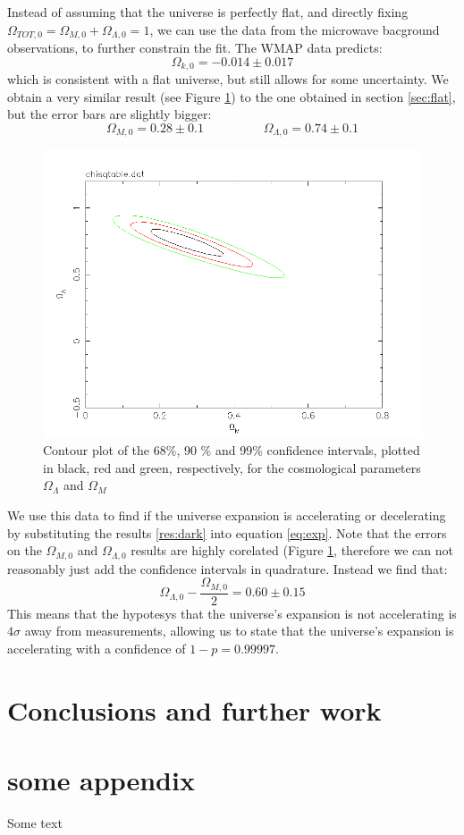 \documentclass[11pt]{article}
\begin{document}
Instead of assuming that the universe is perfectly flat, and directly fixing $\Omega_{TOT,0} = \Omega_{M,0} + \Omega_{\Lambda,0} = 1$, we can use the data from the microwave bacground observations, to further constrain the fit. The WMAP data predicts:
\begin{equation}
	\Omega_{k,0} = -0.014 \pm 0.017
	\label{res:WMAP}
\end{equation}
which is consistent with a flat universe, but still allows for some uncertainty. We obtain a very similar result (see Figure \ref{fig:dark}) to the one obtained in section \ref{sec:flat}, but the error bars are slightly bigger: 
\begin{equation}
	\Omega_{M,0} = 0.28 \pm 0.1
	\hspace{2cm}
	\Omega_{\Lambda,0} = 0.74 \pm 0.1
	\label{res:dark}
\end{equation}
\begin{figure}[htbp]
	\centering
	\includegraphics[width=0.8\linewidth]{dark.png}
	\caption{Contour plot of the 68\%, 90 \% and 99\% confidence intervals, plotted in black, red and green, respectively, for the cosmological parameters $\Omega_\Lambda$ and $\Omega_M$}
	\label{fig:dark}
\end{figure}
We use this data to find if the universe expansion is accelerating or decelerating by substituting the results \eqref{res:dark} into equation \eqref{eq:exp}. Note that the errors on the $\Omega_{M,0}$ and $\Omega_{\Lambda,0}$ results are highly corelated (Figure \ref{fig:dark}, therefore we can not reasonably just add the confidence intervals in quadrature. Instead we find that: 
\begin{equation}
	\Omega_{\Lambda,0} - \frac{\Omega_{M,0}}{2} = 0.60 \pm 0.15
\end{equation}
This means that the hypotesys that the universe's expansion is not accelerating is $4 \sigma$ away from measurements, allowing us to state that the universe's expansion is accelerating with a confidence of $1-p = 0.99997$. 

\section{Conclusions and further work}




\newpage

\appendix
\section{some appendix} 
Some text
\end{document}

